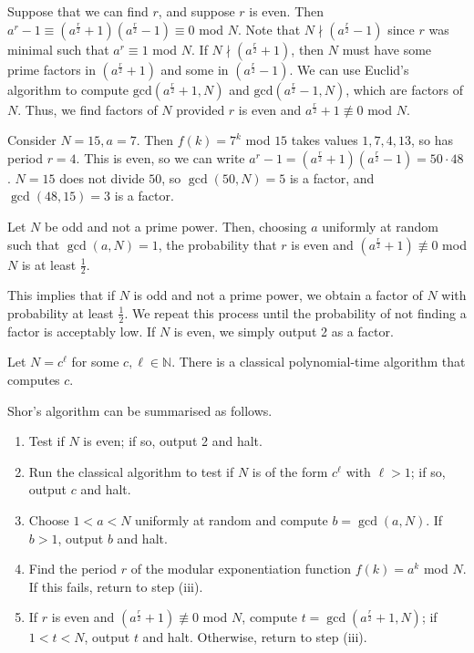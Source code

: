 Suppose that we can find $r$, and suppose $r$ is even.
Then $a^r - 1 \equiv (a^{\frac{r}{2}}+1)(a^{\frac{r}{2}}-1) \equiv 0$ mod $N$.
Note that $N \nmid (a^{\frac{r}{2}}-1)$ since $r$ was minimal such that $a^r \equiv 1$ mod $N$.
If $N \nmid (a^{\frac{r}{2}}+1)$, then $N$ must have some prime factors in $(a^{\frac{r}{2}}+1)$ and some in $(a^{\frac{r}{2}}-1)$.
We can use Euclid's algorithm to compute $\mathrm{gcd}(a^{\frac{r}{2}}+1, N)$ and $\mathrm{gcd}(a^{\frac{r}{2}}-1, N)$, which are factors of $N$.
Thus, we find factors of $N$ provided $r$ is even and $a^{\frac{r}{2}} + 1 \not\equiv 0$ mod $N$.

Consider $N = 15, a = 7$.
Then $f(k) = 7^k$ mod $15$ takes values $1, 7, 4, 13$, so has period $r = 4$.
This is even, so we can write $a^r - 1 = (a^{\frac{r}{2}} + 1)(a^{\frac{r}{2}} - 1) = 50 \cdot 48$.
$N = 15$ does not divide $50$, so $\gcd(50, N) = 5$ is a factor, and $\gcd(48, 15) = 3$ is a factor.
\begin{theorem}
    Let $N$ be odd and not a prime power.
    Then, choosing $a$ uniformly at random such that $\gcd(a,N) = 1$, the probability that $r$ is even and $(a^{\frac{r}{2}} + 1) \not\equiv 0$ mod $N$ is at least $\frac{1}{2}$.
\end{theorem}
This implies that if $N$ is odd and not a prime power, we obtain a factor of $N$ with probability at least $\frac{1}{2}$.
We repeat this process until the probability of not finding a factor is acceptably low.
If $N$ is even, we simply output 2 as a factor.
\begin{lemma}
    Let $N = c^\ell$ for some $c, \ell \in \mathbb N$.
    There is a classical polynomial-time algorithm that computes $c$.
\end{lemma}
Shor's algorithm can be summarised as follows.
\begin{enumerate}
    \item Test if $N$ is even; if so, output 2 and halt.
    \item Run the classical algorithm to test if $N$ is of the form $c^\ell$ with $\ell > 1$; if so, output $c$ and halt.
    \item Choose $1 < a < N$ uniformly at random and compute $b = \gcd(a,N)$.
    If $b > 1$, output $b$ and halt.
    \item Find the period $r$ of the modular exponentiation function $f(k) = a^k$ mod $N$.
    If this fails, return to step (iii).
    \item If $r$ is even and $(a^{\frac{r}{2}} + 1) \not\equiv 0$ mod $N$, compute $t = \gcd(a^{\frac{r}{2}} + 1, N)$; if $1 < t < N$, output $t$ and halt.
    Otherwise, return to step (iii).
\end{enumerate}
